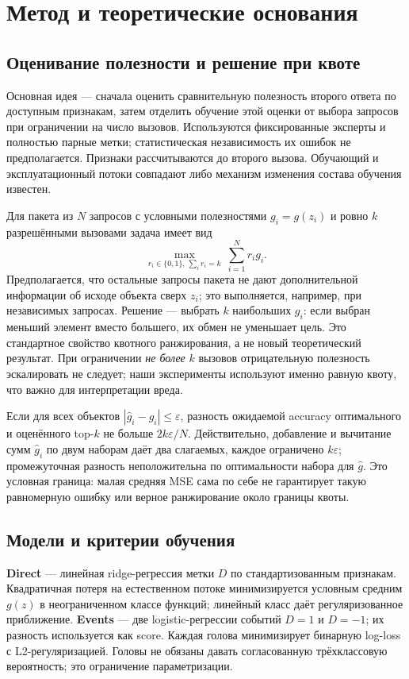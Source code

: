 \section{Метод и теоретические основания}\label{sec:method}
\subsection{Оценивание полезности и решение при квоте}
Основная идея --- сначала оценить сравнительную полезность второго
ответа по доступным признакам, затем отделить обучение этой оценки
от выбора запросов при ограничении на число вызовов.
Используются фиксированные эксперты и полностью парные метки;
статистическая независимость их ошибок не предполагается.
Признаки рассчитываются до второго вызова. Обучающий и эксплуатационный
потоки совпадают либо механизм изменения состава обучения известен.

Для пакета из $N$ запросов с условными полезностями $g_i=g(z_i)$
и ровно $k$ разрешёнными вызовами задача имеет вид
\begin{equation}\label{eq:topk}
\max_{r_i\in\{0,1\},\,\sum_i r_i=k}\ \sum_{i=1}^{N}r_i g_i.
\end{equation}
Предполагается, что остальные запросы пакета не дают дополнительной
информации об исходе объекта сверх $z_i$; это выполняется, например,
при независимых запросах. Решение --- выбрать $k$ наибольших $g_i$:
если выбран меньший элемент вместо большего, их обмен не уменьшает
цель. Это стандартное свойство квотного ранжирования, а не новый
теоретический результат. При ограничении \emph{не более} $k$ вызовов
отрицательную полезность эскалировать не следует; наши эксперименты
используют именно равную квоту, что важно для интерпретации вреда.

Если для всех объектов $|\widehat g_i-g_i|\le\varepsilon$,
разность ожидаемой accuracy оптимального и оценённого top-$k$ не больше
$2k\varepsilon/N$. Действительно, добавление и вычитание сумм
$\widehat g_i$ по двум наборам даёт два слагаемых, каждое ограничено
$k\varepsilon$; промежуточная разность неположительна по оптимальности
набора для $\widehat g$. Это условная граница: малая средняя MSE сама
по себе не гарантирует такую равномерную ошибку или верное ранжирование
около границы квоты.

\subsection{Модели и критерии обучения}
\textbf{Direct} --- линейная ridge-регрессия метки $D$ по
стандартизованным признакам. Квадратичная потеря на естественном потоке
минимизируется условным средним $g(z)$ в неограниченном классе функций;
линейный класс даёт регуляризованное приближение.
\textbf{Events} --- две logistic-регрессии событий $D=1$ и $D=-1$;
их разность используется как score. Каждая голова минимизирует
бинарную log-loss с L2-регуляризацией. Головы не обязаны давать
согласованную трёхклассовую вероятность; это ограничение параметризации.

